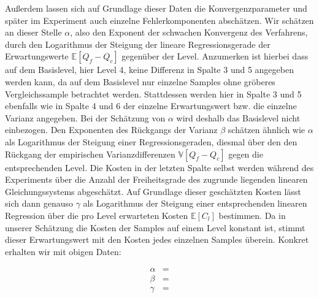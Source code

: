 Außerdem lassen sich auf Grundlage dieser Daten die Konvergenzparameter und später im Experiment auch einzelne Fehlerkomponenten abschätzen. 
Wir schätzen an dieser Stelle $ \alpha $, also den Exponent der schwachen Konvergenz des Verfahrens, durch den Logarithmus der Steigung der lineare Regressionsgerade der Erwartungswerte $ \mathbb{E}[Q_f - Q_c] $ gegenüber der Level. Anzumerken ist hierbei dass auf dem Basislevel, hier Level 4, keine Differenz in Spalte 3 und 5 angegeben werden kann, da auf dem Basislevel nur einzelne Samples ohne gröberes Vergleichssample betrachtet werden. Stattdessen werden hier in Spalte 3 und 5 ebenfalls wie in Spalte 4 und 6 der einzelne Erwartungswert bzw. die einzelne Varianz angegeben. Bei der Schätzung von $ \alpha $ wird deshalb das Basislevel nicht einbezogen.
Den Exponenten des Rückgangs der Varianz $ \beta $ schätzen ähnlich wie $ \alpha $ als Logarithmus der Steigung einer Regressionsgeraden, diesmal über den den Rückgang der empirischen Varianzdifferenzen  $ \mathbb{V}[Q_f-Q_c] $ gegen die entsprechenden Level. Die Kosten in der letzten Spalte selbst werden während des Experiments über die Anzahl der Freiheitsgrade des zugrunde liegenden linearen Gleichungssystems abgeschätzt. 
Auf Grundlage dieser geschätzten Kosten lässt sich dann genauso $ \gamma $ als Logarithmus der Steigung einer entsprechenden linearen Regression über die pro Level erwarteten Kosten $ \mathbb{E}[C_l] $ bestimmen. Da in unserer Schätzung die Kosten der Samples auf einem Level konstant ist, stimmt dieser Erwartungswert mit den Kosten jedes einzelnen Samples überein.  
Konkret erhalten wir mit obigen Daten: 

\begin{align*}
\alpha &= \\
\beta &= \\
\gamma &= \\
\end{align*}
